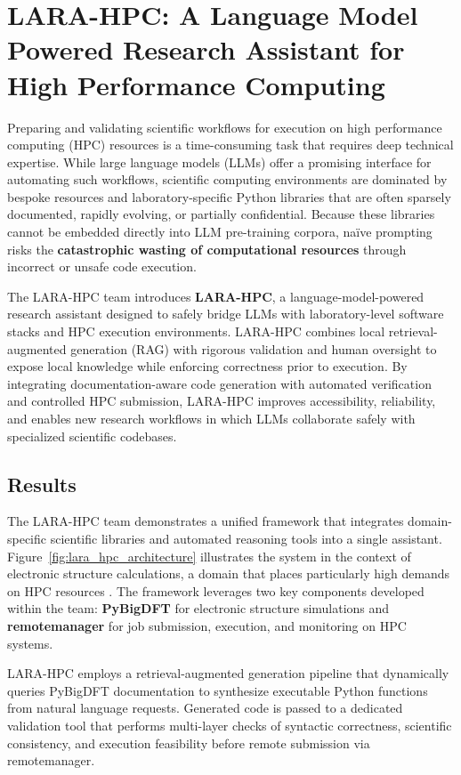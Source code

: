 \section{LARA-HPC: A Language Model Powered Research Assistant for High Performance Computing}

Preparing and validating scientific workflows for execution on high performance computing (HPC) resources is a time-consuming task that requires deep technical expertise. While large language models (LLMs) offer a promising interface for automating such workflows, scientific computing environments are dominated by bespoke resources and laboratory-specific Python libraries that are often sparsely documented, rapidly evolving, or partially confidential. Because these libraries cannot be embedded directly into LLM pre-training corpora, naïve prompting risks the \textbf{catastrophic wasting of computational resources} through incorrect or unsafe code execution.

The LARA-HPC team introduces \textbf{LARA-HPC}, a language-model-powered research assistant designed to safely bridge LLMs with laboratory-level software stacks and HPC execution environments. LARA-HPC combines local retrieval-augmented generation (RAG) with rigorous validation and human oversight to expose local knowledge while enforcing correctness prior to execution. By integrating documentation-aware code generation with automated verification and controlled HPC submission, LARA-HPC improves accessibility, reliability, and enables new research workflows in which LLMs collaborate safely with specialized scientific codebases.

\subsection*{Results}

The LARA-HPC team demonstrates a unified framework that integrates domain-specific scientific libraries and automated reasoning tools into a single assistant. Figure~\ref{fig:lara_hpc_architecture} illustrates the system in the context of electronic structure calculations, a domain that places particularly high demands on HPC resources \cite{Gavini2023}. The framework leverages two key components developed within the team: \textbf{PyBigDFT} \cite{ratcliff2020, pybigdft} for electronic structure simulations and \textbf{remotemanager} \cite{Dawson2024, remotemanager} for job submission, execution, and monitoring on HPC systems.

LARA-HPC employs a retrieval-augmented generation pipeline that dynamically queries PyBigDFT documentation to synthesize executable Python functions from natural language requests. Generated code is passed to a dedicated validation tool that performs multi-layer checks of syntactic correctness, scientific consistency, and execution feasibility before remote submission via remotemanager.

